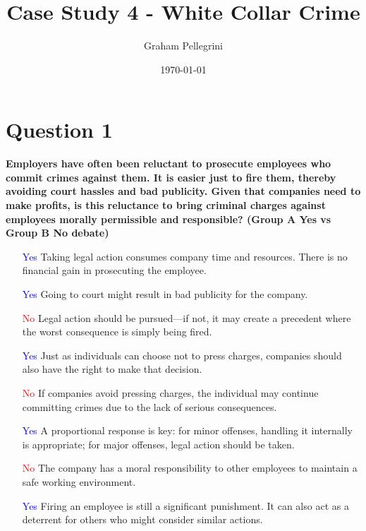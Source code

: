 \documentclass[12pt]{article}
\title{Case Study 4 - White Collar Crime}
\author{Graham Pellegrini }
\date{\today}
\begin{document}
\maketitle
\section*{Question 1}
\textbf{Employers have often been reluctant to prosecute employees who commit crimes against them. It is easier just to fire them, thereby avoiding court hassles and bad publicity. Given that companies need to make profits, is this reluctance to bring criminal charges against employees morally permissible and responsible? (Group A Yes vs Group B No debate)}

\begin{itemize}
    \item [\textcolor{blue}{Yes}] Taking legal action consumes company time and resources. There is no financial gain in prosecuting the employee.
    
    \item [\textcolor{blue}{Yes}] Going to court might result in bad publicity for the company.

    \item [\textcolor{red}{No}] Legal action should be pursued—if not, it may create a precedent where the worst consequence is simply being fired.

    \item [\textcolor{blue}{Yes}] Just as individuals can choose not to press charges, companies should also have the right to make that decision.

    \item [\textcolor{red}{No}] If companies avoid pressing charges, the individual may continue committing crimes due to the lack of serious consequences.

    \item [\textcolor{blue}{Yes}] A proportional response is key: for minor offenses, handling it internally is appropriate; for major offenses, legal action should be taken.

    \item [\textcolor{red}{No}] The company has a moral responsibility to other employees to maintain a safe working environment.

    \item [\textcolor{blue}{Yes}] Firing an employee is still a significant punishment. It can also act as a deterrent for others who might consider similar actions.


\end{itemize}
\end{document}
